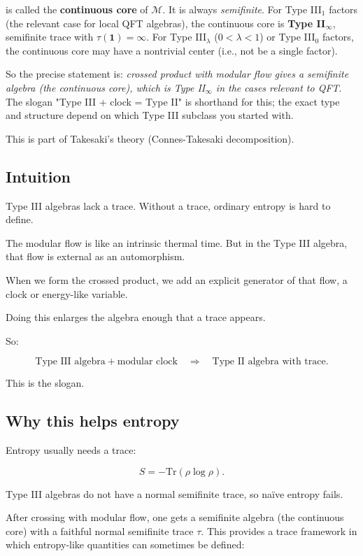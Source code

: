 \documentclass[11pt,a4paper]{article}
\begin{document}
is called the \textbf{continuous core} of $\mathcal{M}$. It is always \emph{semifinite}. For Type III$_1$ factors (the relevant case for local QFT algebras), the continuous core is \textbf{Type II$_\infty$}, semifinite trace with $\tau(\mathbf{1}) = \infty$. For Type III$_\lambda$ ($0 < \lambda < 1$) or Type III$_0$ factors, the continuous core may have a nontrivial center (i.e., not be a single factor).

So the precise statement is: \emph{crossed product with modular flow gives a semifinite algebra (the continuous core), which is Type II$_\infty$ in the cases relevant to QFT}. The slogan "Type III + clock = Type II" is shorthand for this; the exact type and structure depend on which Type III subclass you started with.

This is part of Takesaki's theory (Connes-Takesaki decomposition).

\subsection{Intuition}

Type III algebras lack a trace. Without a trace, ordinary entropy is hard to define.

The modular flow is like an intrinsic thermal time. But in the Type III algebra, that flow is external as an automorphism.

When we form the crossed product, we add an explicit generator of that flow, a clock or energy-like variable.

Doing this enlarges the algebra enough that a trace appears.

So:

\[
\text{Type III algebra}
+
\text{modular clock}
\quad
\Longrightarrow
\quad
\text{Type II algebra with trace}.
\]

This is the slogan.

\subsection{Why this helps entropy}

Entropy usually needs a trace:

\[
S=-\mathrm{Tr}(\rho\log\rho).
\]

Type III algebras do not have a normal semifinite trace, so naïve entropy fails.

After crossing with modular flow, one gets a semifinite algebra (the continuous core) with a faithful normal semifinite trace $\tau$. This provides a trace framework in which entropy-like quantities can sometimes be defined:
\end{document}
